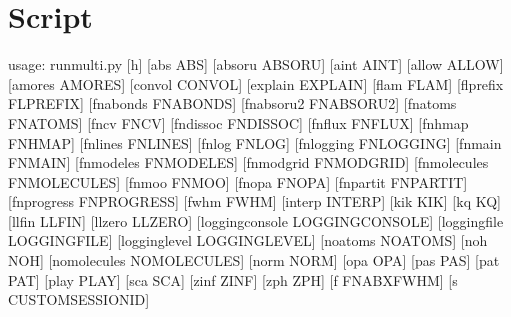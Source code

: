 \documentclass[letterpaper,10pt,english]{sphinxmanual}
\begin{document}
\section{Script }
\label{\detokenize{autoscripts/script-run-multi:script-run-multi-py}}\label{\detokenize{autoscripts/script-run-multi::doc}}
\begin{sphinxVerbatim}[commandchars=\\\{\}]
usage: run\PYGZhy{}multi.py [\PYGZhy{}h] [\PYGZhy{}\PYGZhy{}abs ABS] [\PYGZhy{}\PYGZhy{}absoru ABSORU] [\PYGZhy{}\PYGZhy{}aint AINT]
                    [\PYGZhy{}\PYGZhy{}allow ALLOW] [\PYGZhy{}\PYGZhy{}amores AMORES] [\PYGZhy{}\PYGZhy{}convol CONVOL]
                    [\PYGZhy{}\PYGZhy{}explain EXPLAIN] [\PYGZhy{}\PYGZhy{}flam FLAM] [\PYGZhy{}\PYGZhy{}flprefix FLPREFIX]
                    [\PYGZhy{}\PYGZhy{}fn\PYGZus{}abonds FN\PYGZus{}ABONDS] [\PYGZhy{}\PYGZhy{}fn\PYGZus{}absoru2 FN\PYGZus{}ABSORU2]
                    [\PYGZhy{}\PYGZhy{}fn\PYGZus{}atoms FN\PYGZus{}ATOMS] [\PYGZhy{}\PYGZhy{}fn\PYGZus{}cv FN\PYGZus{}CV]
                    [\PYGZhy{}\PYGZhy{}fn\PYGZus{}dissoc FN\PYGZus{}DISSOC] [\PYGZhy{}\PYGZhy{}fn\PYGZus{}flux FN\PYGZus{}FLUX]
                    [\PYGZhy{}\PYGZhy{}fn\PYGZus{}hmap FN\PYGZus{}HMAP] [\PYGZhy{}\PYGZhy{}fn\PYGZus{}lines FN\PYGZus{}LINES]
                    [\PYGZhy{}\PYGZhy{}fn\PYGZus{}log FN\PYGZus{}LOG] [\PYGZhy{}\PYGZhy{}fn\PYGZus{}logging FN\PYGZus{}LOGGING]
                    [\PYGZhy{}\PYGZhy{}fn\PYGZus{}main FN\PYGZus{}MAIN] [\PYGZhy{}\PYGZhy{}fn\PYGZus{}modeles FN\PYGZus{}MODELES]
                    [\PYGZhy{}\PYGZhy{}fn\PYGZus{}modgrid FN\PYGZus{}MODGRID] [\PYGZhy{}\PYGZhy{}fn\PYGZus{}molecules FN\PYGZus{}MOLECULES]
                    [\PYGZhy{}\PYGZhy{}fn\PYGZus{}moo FN\PYGZus{}MOO] [\PYGZhy{}\PYGZhy{}fn\PYGZus{}opa FN\PYGZus{}OPA]
                    [\PYGZhy{}\PYGZhy{}fn\PYGZus{}partit FN\PYGZus{}PARTIT] [\PYGZhy{}\PYGZhy{}fn\PYGZus{}progress FN\PYGZus{}PROGRESS]
                    [\PYGZhy{}\PYGZhy{}fwhm FWHM] [\PYGZhy{}\PYGZhy{}interp INTERP] [\PYGZhy{}\PYGZhy{}kik KIK] [\PYGZhy{}\PYGZhy{}kq KQ]
                    [\PYGZhy{}\PYGZhy{}llfin LLFIN] [\PYGZhy{}\PYGZhy{}llzero LLZERO]
                    [\PYGZhy{}\PYGZhy{}logging\PYGZus{}console LOGGING\PYGZus{}CONSOLE]
                    [\PYGZhy{}\PYGZhy{}logging\PYGZus{}file LOGGING\PYGZus{}FILE]
                    [\PYGZhy{}\PYGZhy{}logging\PYGZus{}level LOGGING\PYGZus{}LEVEL] [\PYGZhy{}\PYGZhy{}no\PYGZus{}atoms NO\PYGZus{}ATOMS]
                    [\PYGZhy{}\PYGZhy{}no\PYGZus{}h NO\PYGZus{}H] [\PYGZhy{}\PYGZhy{}no\PYGZus{}molecules NO\PYGZus{}MOLECULES] [\PYGZhy{}\PYGZhy{}norm NORM]
                    [\PYGZhy{}\PYGZhy{}opa OPA] [\PYGZhy{}\PYGZhy{}pas PAS] [\PYGZhy{}\PYGZhy{}pat PAT] [\PYGZhy{}\PYGZhy{}play PLAY]
                    [\PYGZhy{}\PYGZhy{}sca SCA] [\PYGZhy{}\PYGZhy{}zinf ZINF] [\PYGZhy{}\PYGZhy{}zph ZPH] [\PYGZhy{}f FN\PYGZus{}ABXFWHM]
                    [\PYGZhy{}s CUSTOM\PYGZus{}SESSION\PYGZus{}ID]


\end{sphinxVerbatim}
\end{document}
